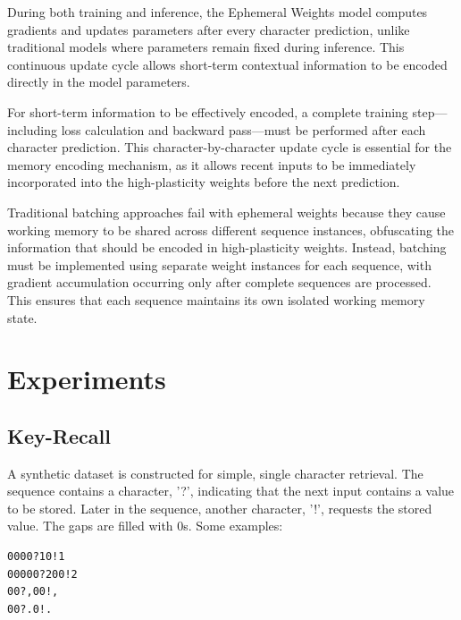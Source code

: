 During both training and inference, the Ephemeral Weights model computes gradients and updates parameters after every character prediction, unlike traditional models where parameters remain fixed during inference. This continuous update cycle allows short-term contextual information to be encoded directly in the model parameters.

For short-term information to be effectively encoded, a complete training step—including loss calculation and backward pass—must be performed after each character prediction. This character-by-character update cycle is essential for the memory encoding mechanism, as it allows recent inputs to be immediately incorporated into the high-plasticity weights before the next prediction.

Traditional batching approaches fail with ephemeral weights because they cause working memory to be shared across different sequence instances, obfuscating the information that should be encoded in high-plasticity weights. Instead, batching must be implemented using separate weight instances for each sequence, with gradient accumulation occurring only after complete sequences are processed. This ensures that each sequence maintains its own isolated working memory state.

\section{Experiments}

\subsection{Key-Recall}
A synthetic dataset is constructed for simple, single character retrieval. The sequence contains a character, '?', indicating that the next input contains a value to be stored. Later in the sequence, another character, '!', requests the stored value. The gaps are filled with 0s. Some examples:
\begin{verbatim}
0000?10!1
00000?200!2
00?,00!,
00?.0!.
\end{verbatim}

